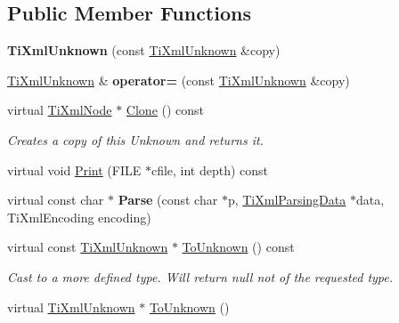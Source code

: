 \subsection*{\-Public \-Member \-Functions}
\begin{DoxyCompactItemize}
\item 
\hypertarget{class_ti_xml_unknown_abe798ff4feea31474850c7f0de6bdf5e}{{\bfseries \-Ti\-Xml\-Unknown} (const \hyperlink{class_ti_xml_unknown}{\-Ti\-Xml\-Unknown} \&copy)}\label{class_ti_xml_unknown_abe798ff4feea31474850c7f0de6bdf5e}

\item 
\hypertarget{class_ti_xml_unknown_a60560b5aacb4bdc8b2b5f02f0a99c5c0}{\hyperlink{class_ti_xml_unknown}{\-Ti\-Xml\-Unknown} \& {\bfseries operator=} (const \hyperlink{class_ti_xml_unknown}{\-Ti\-Xml\-Unknown} \&copy)}\label{class_ti_xml_unknown_a60560b5aacb4bdc8b2b5f02f0a99c5c0}

\item 
\hypertarget{class_ti_xml_unknown_a675c4b2684af35e4c7649b7fd5ae598d}{virtual \hyperlink{class_ti_xml_node}{\-Ti\-Xml\-Node} $\ast$ \hyperlink{class_ti_xml_unknown_a675c4b2684af35e4c7649b7fd5ae598d}{\-Clone} () const }\label{class_ti_xml_unknown_a675c4b2684af35e4c7649b7fd5ae598d}

\begin{DoxyCompactList}\small\item\em \-Creates a copy of this \-Unknown and returns it. \end{DoxyCompactList}\item 
virtual void \hyperlink{class_ti_xml_unknown_a025f19c21ef01ea9be50febb8fe0ba06}{\-Print} (\-F\-I\-L\-E $\ast$cfile, int depth) const 
\item 
\hypertarget{class_ti_xml_unknown_aa51c2694e4177b5f0b5429ee5a81b58d}{virtual const char $\ast$ {\bfseries \-Parse} (const char $\ast$p, \hyperlink{class_ti_xml_parsing_data}{\-Ti\-Xml\-Parsing\-Data} $\ast$data, \-Ti\-Xml\-Encoding encoding)}\label{class_ti_xml_unknown_aa51c2694e4177b5f0b5429ee5a81b58d}

\item 
\hypertarget{class_ti_xml_unknown_ab0313e5fe77987d746ac1a97a254419d}{virtual const \hyperlink{class_ti_xml_unknown}{\-Ti\-Xml\-Unknown} $\ast$ \hyperlink{class_ti_xml_unknown_ab0313e5fe77987d746ac1a97a254419d}{\-To\-Unknown} () const }\label{class_ti_xml_unknown_ab0313e5fe77987d746ac1a97a254419d}

\begin{DoxyCompactList}\small\item\em \-Cast to a more defined type. \-Will return null not of the requested type. \end{DoxyCompactList}\item 
\hypertarget{class_ti_xml_unknown_a67c9fd22940e8c47f706a72cdd2e332c}{virtual \hyperlink{class_ti_xml_unknown}{\-Ti\-Xml\-Unknown} $\ast$ \hyperlink{class_ti_xml_unknown_a67c9fd22940e8c47f706a72cdd2e332c}{\-To\-Unknown} ()}\label{class_ti_xml_unknown_a67c9fd22940e8c47f706a72cdd2e332c}


\end{DoxyCompactItemize}
